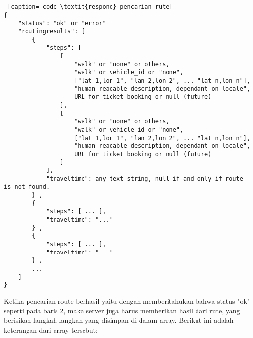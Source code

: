 \begin{lstlisting} [caption= code \textit{respond} pencarian rute]
{ 
    "status": "ok" or "error" 
    "routingresults": [ 
        {
            "steps": [
                [
                    "walk" or "none" or others,
                    "walk" or vehicle_id or "none",
                    ["lat_1,lon_1", "lan_2,lon_2", ... "lat_n,lon_n"],
                    "human readable description, dependant on locale",
                    URL for ticket booking or null (future)
                ],
                [
                    "walk" or "none" or others,
                    "walk" or vehicle_id or "none",
                    ["lat_1,lon_1", "lan_2,lon_2", ... "lat_n,lon_n"],
                    "human readable description, dependant on locale",
                    URL for ticket booking or null (future)
                ]
            ],
            "traveltime": any text string, null if and only if route is not found.
        } ,
        {
            "steps": [ ... ],
            "traveltime": "..."
        } ,
        {
            "steps": [ ... ],
            "traveltime": "..."
        } ,
        ...     
    ]
}
\end{lstlisting}

Ketika pencarian route berhasil yaitu dengan memberitahukan bahwa status "ok" seperti pada baris 2, maka server juga harus memberikan hasil dari rute, yang berisikan langkah-langkah yang disimpan di dalam array. Berikut ini adalah keterangan dari array tersebut:

